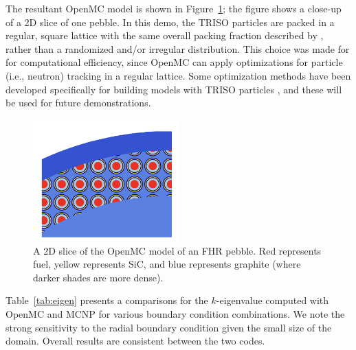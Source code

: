 The resultant OpenMC model is shown in Figure~\ref{f:openmc_pebble}; the figure shows a close-up of a 2D slice of one pebble.  In this demo, the TRISO particles are packed in a regular, square lattice with the same overall packing fraction described by \cite{phillips2010}, rather than a randomized and/or irregular distribution.  This choice was made for for computational efficiency, since OpenMC can apply optimizations for particle (i.e., neutron) tracking in a regular lattice.  Some optimization methods have been developed specifically for building models with TRISO particles \cite{openmcdocs_triso}, and these will be used for future demonstrations.

\begin{figure}[!h]
\centering
\includegraphics[clip=true,width=0.5\textwidth]{Figures/pebble_yz_cropped.png}
\caption{A 2D slice of the OpenMC model of an FHR pebble.  Red represents fuel, yellow represents
SiC, and blue represents graphite (where darker shades are more dense).}
\label{f:openmc_pebble}
\end{figure}

Table~\ref{tab:eigen} presents a comparisons for the $k$-eigenvalue computed with OpenMC and MCNP for various boundary condition combinations. We note the strong sensitivity to the radial boundary condition given the small size of the domain. Overall results are consistent between the two codes.

